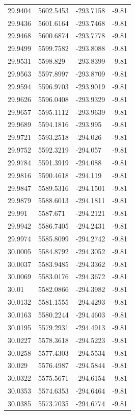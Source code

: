 \begin{table}[H]
\begin{tabular}{llll}
29.9404 & 5602.5453 & -293.7158 & -9.81 \\
29.9436 & 5601.6164 & -293.7468 & -9.81 \\
29.9468 & 5600.6874 & -293.7778 & -9.81 \\
29.9499 & 5599.7582 & -293.8088 & -9.81 \\
29.9531 & 5598.829 & -293.8399 & -9.81 \\
29.9563 & 5597.8997 & -293.8709 & -9.81 \\
29.9594 & 5596.9703 & -293.9019 & -9.81 \\
29.9626 & 5596.0408 & -293.9329 & -9.81 \\
29.9657 & 5595.1112 & -293.9639 & -9.81 \\
29.9689 & 5594.1816 & -293.995 & -9.81 \\
29.9721 & 5593.2518 & -294.026 & -9.81 \\
29.9752 & 5592.3219 & -294.057 & -9.81 \\
29.9784 & 5591.3919 & -294.088 & -9.81 \\
29.9816 & 5590.4618 & -294.119 & -9.81 \\
29.9847 & 5589.5316 & -294.1501 & -9.81 \\
29.9879 & 5588.6013 & -294.1811 & -9.81 \\
29.991 & 5587.671 & -294.2121 & -9.81 \\
29.9942 & 5586.7405 & -294.2431 & -9.81 \\
29.9974 & 5585.8099 & -294.2742 & -9.81 \\
30.0005 & 5584.8792 & -294.3052 & -9.81 \\
30.0037 & 5583.9485 & -294.3362 & -9.81 \\
30.0069 & 5583.0176 & -294.3672 & -9.81 \\
30.01 & 5582.0866 & -294.3982 & -9.81 \\
30.0132 & 5581.1555 & -294.4293 & -9.81 \\
30.0163 & 5580.2244 & -294.4603 & -9.81 \\
30.0195 & 5579.2931 & -294.4913 & -9.81 \\
30.0227 & 5578.3618 & -294.5223 & -9.81 \\
30.0258 & 5577.4303 & -294.5534 & -9.81 \\
30.029 & 5576.4987 & -294.5844 & -9.81 \\
30.0322 & 5575.5671 & -294.6154 & -9.81 \\
30.0353 & 5574.6353 & -294.6464 & -9.81 \\
30.0385 & 5573.7035 & -294.6774 & -9.81 \\

\end{tabular}
\end{table}
